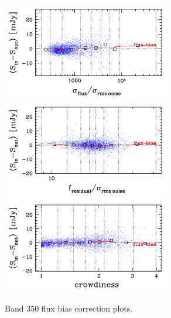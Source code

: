 \documentclass[11pt,a4paper]{article}
\begin{document}
\begin{figure}[H]
	\caption{
	    Band 350 flux bias correction plots.
	}
	\includegraphics[width=0.65\textwidth]{galsim_350_fbias_1}
	\includegraphics[width=0.65\textwidth]{galsim_350_fbias_2}
	\includegraphics[width=0.65\textwidth]{galsim_350_fbias_3}
\end{figure}
\end{document}

